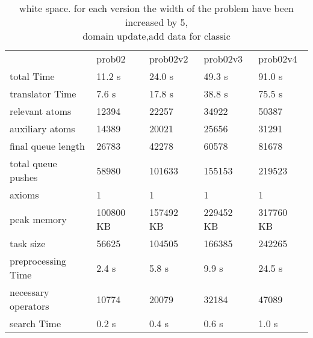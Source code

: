 			
			\begin{table}[h]
				\centering
				\caption{white space. for each version the width of the problem have been increased by 5,\\ domain update,\huge add data for classic}
				
				\label{whitespace}
				\begin{tabular}{lllll}
					& prob02 & prob02v2 & prob02v3 & prob02v4\\
					total Time & 11.2 s& 24.0 s& 49.3 s& 91.0 s\\
					translator Time& 7.6 s& 17.8 s& 38.8 s & 75.5 s\\
					
					
					relevant atoms & 12394 & 22257 & 34922  & 50387\\
					auxiliary atoms &14389 & 20021 & 25656  & 31291\\
					final queue length &26783 & 42278 &60578  & 81678\\
					total queue pushes & 58980 & 101633 & 155153 & 219523\\
					axioms & 1 & 1  & 1 & 1 \\ 
					peak memory & 100800 KB & 157492 KB & 229452 KB& 317760 KB\\ 
					task size & 56625 &  104505 & 166385 & 242265\\
					
					
					preprocessing Time& 2.4 s& 5.8 s& 9.9 s & 24.5 s \\
					necessary operators & 10774 & 20079  & 32184 & 47089\\
					
					
					search Time & 0.2 s& 0.4 s& 0.6 s& 1.0 s\\
				\end{tabular}
			\end{table}
			
